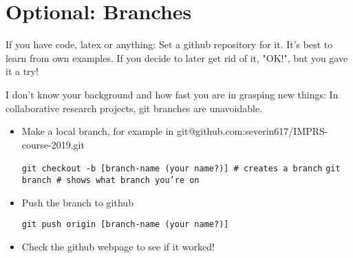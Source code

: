 \documentclass[11pt]{article}
\begin{document}
\section*{Optional: Branches}
If you have code, latex or anything: Set a github repository for it. It's best to learn from own examples. If you decide to later get rid of it, "OK!", but you gave it a try!

I don't know your background and how fast you are in grasping new things: In collaborative research projects, git branches are unavoidable.
\begin{itemize}
	\item Make a local branch, for example in git@github.com:severin617/IMPRS-course-2019.git
	\begin{framed}
		\texttt{git checkout -b [branch-name (your name?)] \# creates a branch}\newline
		\texttt{git branch \# shows what branch you're on }
	\end{framed}
	\item Push the branch to github
	\begin{framed}
		\texttt{git push origin [branch-name (your name?)]}
	\end{framed}
	\item Check the github webpage to see if it worked!
\end{itemize}
\end{document}
